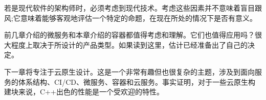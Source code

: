 若是现代软件的架构师时，必须考虑到现代技术。考虑这些因素并不意味着盲目跟风;它意味着能够客观地评估一个特定的命题，在现在所处的情况下是否有意义。

前几章介绍的微服务和本章介绍的容器都值得考虑和理解。它们也值得应用吗？很大程度上取决于所设计的产品类型。如果读到这里，估计已经准备出了自己的决定。

下一章将专注于云原生设计。这是一个非常有趣但也很复杂的主题，涉及到面向服务的体系结构、CI/CD、微服务、容器和云服务。事实证明，对于一些云原生构建块来说，C++出色的性能是一个受欢迎的特性。